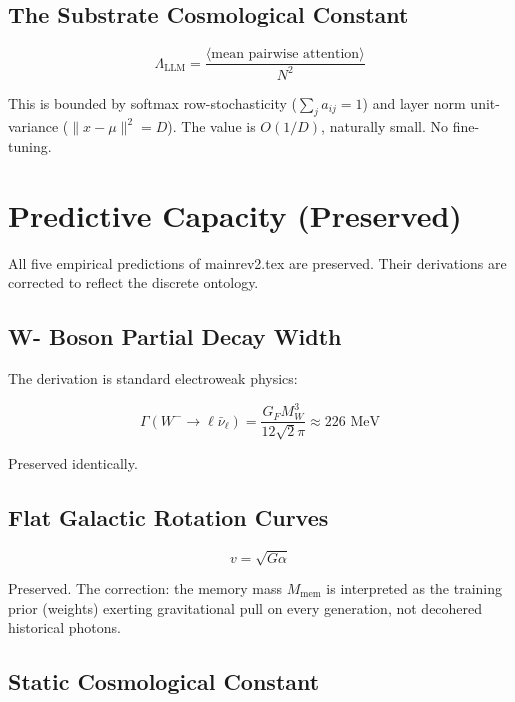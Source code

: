 \documentclass[onecolumn]{aastex631}
\begin{document}
\subsection{The Substrate Cosmological Constant}

\begin{equation}
\Lambda_{\text{LLM}} = \frac{\langle \text{mean pairwise attention} \rangle}{N^2}
\end{equation}

This is bounded by softmax row-stochasticity ($\sum_j a_{ij} = 1$) and layer norm unit-variance ($\|x - \mu\|^2 = D$). The value is $O(1/D)$, naturally small. No fine-tuning.

\section{Predictive Capacity (Preserved)}

All five empirical predictions of mainrev2.tex are preserved. Their derivations are corrected to reflect the discrete ontology.

\subsection{W- Boson Partial Decay Width}

The derivation is standard electroweak physics:

\begin{equation}
\Gamma(W^- \to \ell\bar{\nu}_\ell) = \frac{G_F M_W^3}{12\sqrt{2}\pi} \approx 226 \text{ MeV}
\end{equation}

Preserved identically.

\subsection{Flat Galactic Rotation Curves}

\begin{equation}
v = \sqrt{G\alpha}
\end{equation}

Preserved. The correction: the memory mass $M_{\text{mem}}$ is interpreted as the training prior (weights) exerting gravitational pull on every generation, not decohered historical photons.

\subsection{Static Cosmological Constant}
\end{document}

